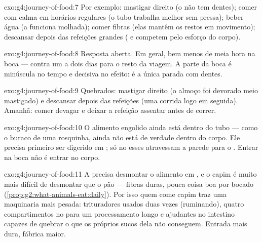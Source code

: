 \begin{solution}{exo:g4:journey-of-food:7}
Por exemplo: mastigar direito (o  não tem dentes); comer com
calma em horários regulares (o tubo trabalha melhor sem pressa);
beber água (a  funciona molhada); comer fibras (elas mantêm
os restos em movimento); descansar depois das refeições grandes
( e  competem pelo esforço do corpo).
\end{solution}

\begin{solution}{exo:g4:journey-of-food:8}
Resposta aberta. Em geral, bem menos de meia hora na boca --- contra
um a dois dias para o resto da viagem. A parte da boca é minúscula
no tempo e decisiva no efeito: é a única parada com dentes.
\end{solution}

\begin{solution}{exo:g4:journey-of-food:9}
Quebrados: mastigar direito (o almoço foi devorado meio mastigado) e
descansar depois das refeições (uma corrida logo em seguida).
Amanhã: comer devagar e deixar a refeição assentar antes de correr.
\end{solution}

\begin{solution}{exo:g4:journey-of-food:10}
O alimento engolido ainda está dentro do tubo --- como o buraco de
uma rosquinha, ainda não está de verdade dentro do corpo. Ele
precisa primeiro ser digerido em ; só no 
esses  atravessam a parede para o . Entrar na boca
não é entrar no corpo.
\end{solution}

\begin{solution}{exo:g4:journey-of-food:11}
A  precisa desmontar o alimento em , e o capim é
muito mais difícil de desmontar que o pão --- fibras duras, pouca
coisa boa por bocado
(\cref{prop:g2:what-animals-eat:daily}). Por isso quem come capim
traz uma maquinaria mais pesada:  trituradores usados duas
vezes (ruminando), quatro compartimentos no  para um
processamento longo e ajudantes no intestino capazes de quebrar o
que os próprios sucos dela não conseguem. Entrada mais dura,
fábrica maior.
\end{solution}
